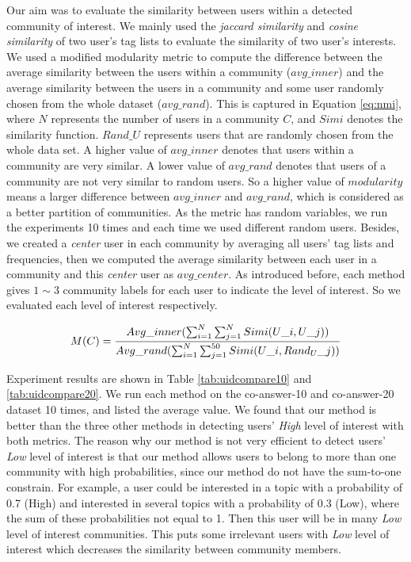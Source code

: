 Our aim was to evaluate the similarity between users within a detected community of interest. We mainly used the \textit{jaccard similarity} and \textit{cosine similarity} of two user's tag lists to evaluate the similarity of two user's interests. We used a modified modularity metric to compute the difference between the average similarity between the users within a community ($avg\_inner$) and the average similarity between the users in a community and some user randomly chosen from the whole dataset ($avg\_rand$). This is captured in Equation \ref{eq:nmi}, where $N$ represents the number of users in a community $C$, and $Simi$ denotes the similarity function. $Rand\_U$ represents users that are randomly chosen from the whole data set. A higher value of $avg\_inner$ denotes that users within a community are very similar. A lower value of $avg\_rand$ denotes that users of a community are not very similar to random users. So a higher value of $modularity$ means a larger difference between $avg\_inner$ and $avg\_rand$, which is considered as a better partition of communities. As the metric has random variables, we run the experiments 10 times and each time we used different random users. Besides, we created a \textit{center} user in each community by averaging all users' tag lists and frequencies, then we computed the average similarity between each user in a community and this \textit{center} user as $avg\_center$. 
As introduced before, each method gives $1\sim3$ community labels for each user to indicate the level of interest. So we evaluated each level of interest respectively.

\begin{equation}
  M(C) \\
  =\frac{Avg\_inner(\sum_{i=1}^{N}\sum_{j=1}^{N} Simi(U\_i,U\_j))}{Avg\_rand(\sum_{i=1}^{N}\sum_{j=1}^{50} Simi(U\_i,Rand_U\_j))}
\label{eq:nmi}
\end{equation}

Experiment results are shown in Table \ref{tab:uidcompare10} and \ref{tab:uidcompare20}. We run each method on the co-answer-10 and co-answer-20 dataset 10 times, and listed the average value. We found that our method is better than the three other methods in detecting users' \textit{High} level of interest with both metrics. The reason why our method is not very efficient to detect users' \textit{Low} level of interest is that our method allows users to belong to more than one community with high probabilities, since our method do not have the sum-to-one constrain. For example, a user could be interested in a topic with a probability of 0.7 (High) and interested in several topics with a probability of 0.3 (Low), where the sum of these probabilities not equal to 1. Then this user will be in many \textit{Low} level of interest communities. This puts some irrelevant users with \textit{Low} level of interest which decreases the similarity between community members.




